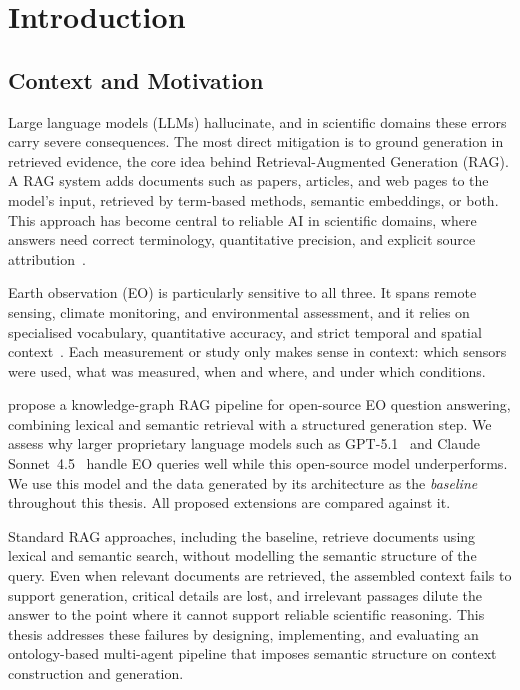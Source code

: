 \chapter{Introduction}
\label{chap:introduction}

\section{Context and Motivation}
\label{sec:context}

Large language models (LLMs) hallucinate, and in scientific domains these errors carry severe consequences. The most direct mitigation is to ground generation in retrieved evidence, the core idea behind Retrieval-Augmented Generation (RAG). A RAG system adds documents such as papers, articles, and web pages to the model's input, retrieved by term-based methods, semantic embeddings, or both. This approach has become central to reliable AI in scientific domains, where answers need correct terminology, quantitative precision, and explicit source attribution~\citep{lewis2020retrieval}.

Earth observation (EO) is particularly sensitive to all three. It spans remote sensing, climate monitoring, and environmental assessment, and it relies on specialised vocabulary, quantitative accuracy, and strict temporal and spatial context~\citep{aschbacher2020earth}. Each measurement or study only makes sense in context: which sensors were used, what was measured, when and where, and under which conditions.

\citet{elbaff2025earthobservationrag} propose a knowledge-graph RAG pipeline for open-source EO question answering, combining lexical and semantic retrieval with a structured generation step. We assess why larger proprietary language models such as GPT-5.1~\citep{openai2024gpt4} and Claude Sonnet~4.5~\citep{anthropic2024claude} handle EO queries well while this open-source model underperforms. We use this model and the data generated by its architecture as the \emph{baseline} throughout this thesis. All proposed extensions are compared against it.

Standard RAG approaches, including the baseline, retrieve documents using lexical and semantic search, without modelling the semantic structure of the query. Even when relevant documents are retrieved, the assembled context fails to support generation, critical details are lost, and irrelevant passages dilute the answer to the point where it cannot support reliable scientific reasoning. This thesis addresses these failures by designing, implementing, and evaluating an
ontology-based multi-agent pipeline that imposes semantic structure on context construction and generation.
